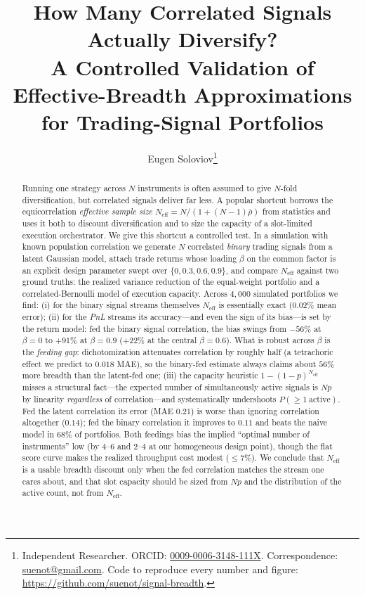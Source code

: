 \documentclass[11pt]{article}
\title{\bfseries How Many Correlated Signals Actually Diversify?\\
A Controlled Validation of Effective-Breadth Approximations\\ for Trading-Signal Portfolios}
\author{Eugen Soloviov\thanks{Independent Researcher. ORCID:
\href{https://orcid.org/0009-0006-3148-111X}{0009-0006-3148-111X}.
Correspondence: \href{mailto:suenot@gmail.com}{suenot@gmail.com}.
Code to reproduce every number and figure:
\url{https://github.com/suenot/signal-breadth}.}}
\date{}
\newcommand{\Neff}{N_{\mathrm{eff}}}
\newcommand{\rbar}{\bar{\rho}}
\begin{document}
\maketitle

\begin{abstract}
Running one strategy across $N$ instruments is often assumed to give $N$-fold
diversification, but correlated signals deliver far less. A popular shortcut
borrows the equicorrelation \emph{effective sample size}
$\Neff = N/(1+(N-1)\rbar)$ from statistics and uses it both to discount
diversification and to size the capacity of a slot-limited execution
orchestrator. We give this shortcut a controlled test. In a simulation with
known population correlation we generate $N$ correlated \emph{binary} trading
signals from a latent Gaussian model, attach trade returns whose loading
$\beta$ on the common factor is an explicit design parameter swept over
$\{0,0.3,0.6,0.9\}$, and compare $\Neff$ against two ground truths: the
realized variance reduction of the equal-weight portfolio and a
correlated-Bernoulli model of execution capacity. Across $4{,}000$ simulated
portfolios we find: (i) for the binary signal streams themselves $\Neff$ is
essentially exact ($0.02\%$ mean error); (ii) for the \emph{PnL} streams its
accuracy---and even the sign of its bias---is set by the return model: fed the
binary signal correlation, the bias swings from $-56\%$ at $\beta=0$ to
$+91\%$ at $\beta=0.9$ ($+22\%$ at the central $\beta=0.6$). What is robust
across $\beta$ is the \emph{feeding gap}: dichotomization attenuates
correlation by roughly half (a tetrachoric effect we predict to $0.018$ MAE),
so the binary-fed estimate always claims about $56\%$ more breadth than the
latent-fed one; (iii) the capacity heuristic $1-(1-p)^{\Neff}$ misses a
structural fact---the expected number of simultaneously active signals is $Np$
by linearity \emph{regardless} of correlation---and systematically undershoots
$P(\ge 1\ \text{active})$. Fed the latent correlation its error (MAE $0.21$)
is worse than ignoring correlation altogether ($0.14$); fed the binary
correlation it improves to $0.11$ and beats the naive model in $68\%$ of
portfolios. Both feedings bias the implied ``optimal number of instruments''
low (by $4$--$6$ and $2$--$4$ at our homogeneous design point), though the
flat score curve makes the realized throughput cost modest ($\le 7\%$). We
conclude that $\Neff$ is a usable breadth discount only when the fed
correlation matches the stream one cares about, and that slot capacity should
be sized from $Np$ and the distribution of the active count, not from
$\Neff$.
\end{abstract}
\end{document}
